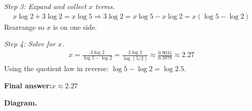 \documentclass[11pt]{article}
\begin{document}
\textit{Step 3: Expand and collect \( x \) terms.}
\[\begin{gathered}
x\log 2 + 3\log 2 = x\log 5 \Rightarrow 3\log 2 = x\log 5 - x\log 2 = x(\log 5 - \log 2)
\end{gathered}\]
Rearrange so \( x \) is on one side.

\textit{Step 4: Solve for \( x \).}
\[\begin{gathered}
x = \frac{3\log 2}{\log 5 - \log 2} = \frac{3\log 2}{\log(5/2)} \approx \frac{0.9031}{0.3979} \approx 2.27
\end{gathered}\]
Using the quotient law in reverse: \( \log 5 - \log 2 = \log 2.5 \).

\begin{answerbox}
\textbf{Final answer:}\quad \(\displaystyle  x \approx 2.27 \)
\end{answerbox}
\textbf{Diagram.}
\end{document}
